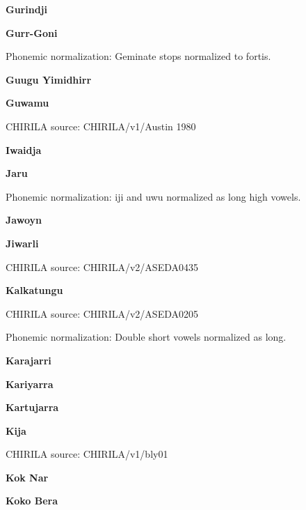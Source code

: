 \textbf{Gurindji}


\textbf{Gurr-Goni}


Phonemic normalization: Geminate stops normalized to fortis.

\textbf{Guugu Yimidhirr}


\textbf{Guwamu}

CHIRILA source: CHIRILA/v1/Austin 1980


\textbf{Iwaidja}


\textbf{Jaru}


Phonemic normalization: iji and uwu normalized as long high vowels.

\textbf{Jawoyn}


\textbf{Jiwarli}

CHIRILA source: CHIRILA/v2/ASEDA0435


\textbf{Kalkatungu}

CHIRILA source: CHIRILA/v2/ASEDA0205


Phonemic normalization: Double short vowels normalized as long.

\textbf{Karajarri}


\textbf{Kariyarra}


\textbf{Kartujarra}


\textbf{Kija}

CHIRILA source: CHIRILA/v1/bly01


\textbf{Kok Nar}


\textbf{Koko Bera}


